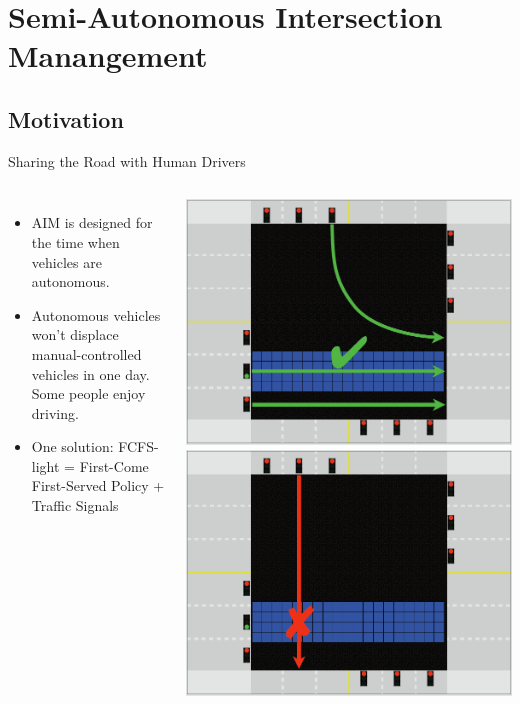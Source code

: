 \documentclass{beamer}
\begin{document}
\section{Semi-Autonomous Intersection Manangement}

\subsection{Motivation}

\begin{frame}{Sharing the Road with Human Drivers}
\begin{columns}[c]
\begin{itemize}
\item AIM is designed for the time when vehicles are autonomous.
\item Autonomous vehicles won't displace manual-controlled vehicles in
one day. Some people enjoy driving.\pause
\item One solution: FCFS-light = First-Come First-Served Policy +
Traffic Signals \cite{bib:Dresner08Multiagent}
\end{itemize}
\includegraphics[width=\textwidth]{fcfs-light-1.png}
\hfill
\includegraphics[width=\textwidth]{fcfs-light-2.png}
\end{columns}
\end{frame}
\end{document}
